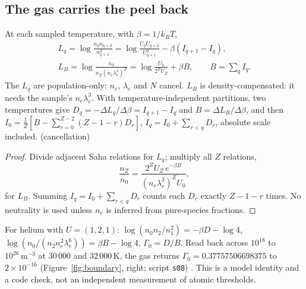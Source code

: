\subsection{The gas carries the peel back}
\begin{theorem}\label{thm:inverse}
At each sampled temperature, with $\beta=1/k_BT$,
\begin{gather*}
L_q=\log\frac{n_qn_{q+2}}{n_{q+1}^2}=\log\frac{U_qU_{q+2}}{U_{q+1}^2}-\beta(I_{q+1}-I_q),\\
L_B=\log\frac{n_0}{n_Z(n_e\lambda_e^3)^Z}=\log\frac{U_0}{2^ZU_Z}+\beta B,\qquad B=\sum_qI_q.
\end{gather*}
The $L_q$ are population-only: $n_e$, $\lambda_e$ and $N$ cancel. $L_B$ is density-compensated: it needs the sample's $n_e\lambda_e^3$. With temperature-independent partitions, two temperatures give $D_q=-\Delta L_q/\Delta\beta=I_{q+1}-I_q$ and $B=\Delta L_B/\Delta\beta$, and then $I_0=\frac1Z[B-\sum_{r=0}^{Z-2}(Z-1-r)D_r]$, $I_q=I_0+\sum_{r<q}D_r$, absolute scale included. (cancellation)
\end{theorem}
\begin{proof}
Divide adjacent Saha relations for $L_q$; multiply all $Z$ relations,
\[\frac{n_Z}{n_0}=\frac{2^ZU_Z\,e^{-\beta B}}{(n_e\lambda_e^3)^ZU_0},\]
for $L_B$. Summing $I_q=I_0+\sum_{r<q}D_r$ counts each $D_r$ exactly $Z-1-r$ times. No neutrality is used unless $n_e$ is inferred from pure-species fractions.
\end{proof}
For helium with $U=(1,2,1)$: $\log(n_0n_2/n_1^2)=-\beta D-\log4$, $\log(n_0/(n_2n_e^2\lambda_e^6))=\beta B-\log4$, $\Gamma_0=D/B$. Read back across $10^{18}$ to $10^{26}\,\mathrm{m^{-3}}$ at $30\,000$ and $32\,000$\,K, the gas returns $\Gamma_0=0.37757506698375$ to $2\times10^{-16}$ (Figure~\ref{fig:boundary}, right; script \texttt{s08}) . This is a model identity and a code check, not an independent measurement of atomic thresholds.


